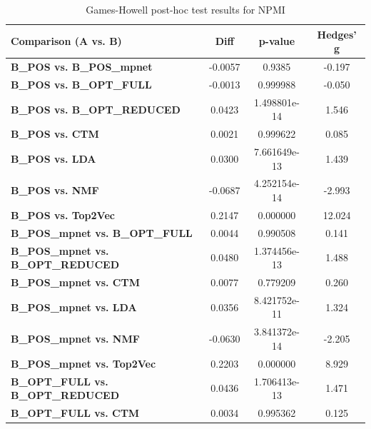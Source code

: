 \begin{table}[ht]
    \centering
    \caption{Games-Howell post-hoc test results for NPMI}
    \label{tab:games_howell_npmi}
    \begin{tabular}{lccc}
        \toprule
        \textbf{Comparison (A vs. B)}              & \textbf{Diff} & \textbf{p-value} & \textbf{Hedges' g} \\
        \midrule
        \textbf{B\_POS vs. B\_POS\_mpnet}          & -0.0057       & 0.9385           & -0.197             \\
        \textbf{B\_POS vs. B\_OPT\_FULL}           & -0.0013       & 0.999988         & -0.050             \\
        \textbf{B\_POS vs. B\_OPT\_REDUCED}        & 0.0423        & 1.498801e-14     & 1.546              \\
        \textbf{B\_POS vs. CTM}                    & 0.0021        & 0.999622         & 0.085              \\
        \textbf{B\_POS vs. LDA}                    & 0.0300        & 7.661649e-13     & 1.439              \\
        \textbf{B\_POS vs. NMF}                    & -0.0687       & 4.252154e-14     & -2.993             \\
        \textbf{B\_POS vs. Top2Vec}                & 0.2147        & 0.000000         & 12.024             \\
        \textbf{B\_POS\_mpnet vs. B\_OPT\_FULL}    & 0.0044        & 0.990508         & 0.141              \\
        \textbf{B\_POS\_mpnet vs. B\_OPT\_REDUCED} & 0.0480        & 1.374456e-13     & 1.488              \\
        \textbf{B\_POS\_mpnet vs. CTM}             & 0.0077        & 0.779209         & 0.260              \\
        \textbf{B\_POS\_mpnet vs. LDA}             & 0.0356        & 8.421752e-11     & 1.324              \\
        \textbf{B\_POS\_mpnet vs. NMF}             & -0.0630       & 3.841372e-14     & -2.205             \\
        \textbf{B\_POS\_mpnet vs. Top2Vec}         & 0.2203        & 0.000000         & 8.929              \\
        \textbf{B\_OPT\_FULL vs. B\_OPT\_REDUCED}  & 0.0436        & 1.706413e-13     & 1.471              \\
        \textbf{B\_OPT\_FULL vs. CTM}              & 0.0034        & 0.995362         & 0.125              \\

\end{tabular}
\end{table}
